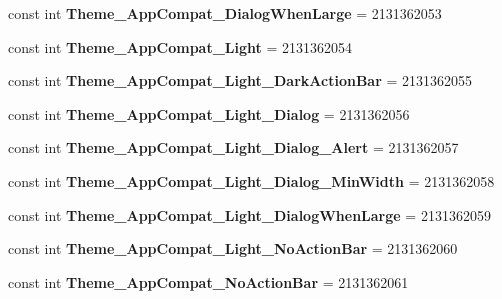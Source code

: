 \begin{DoxyCompactItemize}
const int {\bfseries Theme\+\_\+\+App\+Compat\+\_\+\+Dialog\+When\+Large} = 2131362053
\item 
\mbox{\label{classXaria_1_1Resource_1_1Style_a4b298ce186e62a508b9e875c40a2e675}} 
const int {\bfseries Theme\+\_\+\+App\+Compat\+\_\+\+Light} = 2131362054
\item 
\mbox{\label{classXaria_1_1Resource_1_1Style_ab87aaabf68fbc28bbb6b5bf97c9468f8}} 
const int {\bfseries Theme\+\_\+\+App\+Compat\+\_\+\+Light\+\_\+\+Dark\+Action\+Bar} = 2131362055
\item 
\mbox{\label{classXaria_1_1Resource_1_1Style_a20a7650a58f95156d0982978916743b2}} 
const int {\bfseries Theme\+\_\+\+App\+Compat\+\_\+\+Light\+\_\+\+Dialog} = 2131362056
\item 
\mbox{\label{classXaria_1_1Resource_1_1Style_ab1c02f3f1c36ac2a88ca728727a2cecb}} 
const int {\bfseries Theme\+\_\+\+App\+Compat\+\_\+\+Light\+\_\+\+Dialog\+\_\+\+Alert} = 2131362057
\item 
\mbox{\label{classXaria_1_1Resource_1_1Style_a1a94f93bb92c2c9f92d280c91af4f7a8}} 
const int {\bfseries Theme\+\_\+\+App\+Compat\+\_\+\+Light\+\_\+\+Dialog\+\_\+\+Min\+Width} = 2131362058
\item 
\mbox{\label{classXaria_1_1Resource_1_1Style_a6b4e04a1584c41dc4c75f96c2bbd470c}} 
const int {\bfseries Theme\+\_\+\+App\+Compat\+\_\+\+Light\+\_\+\+Dialog\+When\+Large} = 2131362059
\item 
\mbox{\label{classXaria_1_1Resource_1_1Style_a12831f927f67813166ce5d8268fe9c84}} 
const int {\bfseries Theme\+\_\+\+App\+Compat\+\_\+\+Light\+\_\+\+No\+Action\+Bar} = 2131362060
\item 
\mbox{\label{classXaria_1_1Resource_1_1Style_ab7dd60f96f0e78867ff3be77ec54d529}} 
const int {\bfseries Theme\+\_\+\+App\+Compat\+\_\+\+No\+Action\+Bar} = 2131362061
\item 
\mbox{\label{classXaria_1_1Resource_1_1Style_a9eb1e7baec5264ed7c00f2affec5100a}} 

\end{DoxyCompactItemize}
